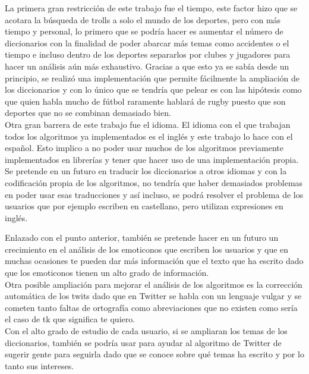 \documentclass[../all.tex]{subfiles}
\begin{document}
	La primera gran restricción de este trabajo fue el tiempo, este factor hizo que se acotara la búsqueda de trolls a solo el mundo de los deportes, pero con más tiempo y personal, lo primero que se podría hacer es aumentar el número de diccionarios con la finalidad de poder abarcar más temas como accidentes o el tiempo e incluso dentro de los deportes separarlos por clubes y jugadores para hacer un análisis aún más exhaustivo. Gracias a que esto ya se sabía desde un principio, se realizó una implementación que permite fácilmente la ampliación de los diccionarios y con lo único que se tendría que pelear es con las hipótesis como que quien habla mucho de fútbol raramente hablará de rugby puesto que son deportes que no se combinan demasiado bien.\\
	
	Otra gran barrera de este trabajo fue el idioma. El idioma con el que trabajan todos los algoritmos ya implementados es el inglés y este trabajo lo hace con el español. Esto implico a no poder usar muchos de los algoritmos previamente implementados en librerías y tener que hacer uso de una implementación propia. Se pretende en un futuro en traducir los diccionarios a otros idiomas y con la codificación propia de los algoritmos, no tendría que haber demasiados problemas en poder usar esas traducciones y así incluso, se podrá resolver el problema de los usuarios que por ejemplo escriben en castellano, pero utilizan expresiones en inglés.
	
	Enlazado con el punto anterior, también se pretende hacer en un futuro un crecimiento en el análisis de los emoticonos que escriben los usuarios y que en muchas ocasiones te pueden dar más información que el texto que ha escrito dado que los emoticonos tienen un alto grado de información.\\
	
	Otra posible ampliación para mejorar el análisis de los algoritmos es la corrección automática de los twits dado que en Twitter se habla con un lenguaje vulgar y se cometen tanto faltas de ortografía como abreviaciones que no existen como sería el caso de tk que significa te quiero.\\
	
	Con el alto grado de estudio de cada usuario, si se ampliaran los temas de los diccionarios, también se podría usar para ayudar al algoritmo de Twitter de sugerir gente para seguirla dado que se conoce sobre qué temas ha escrito y por lo tanto sus intereses.\\
	
\end{document}
